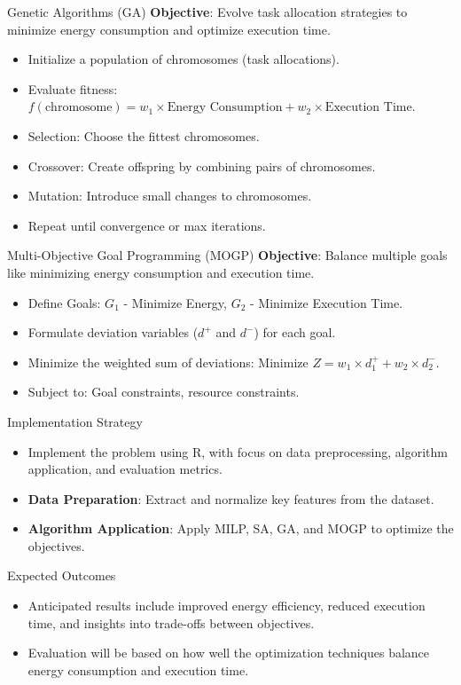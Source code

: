 \documentclass{beamer}
\begin{document}
\begin{frame}{Genetic Algorithms (GA)}
    \textbf{Objective}: Evolve task allocation strategies to minimize energy consumption and optimize execution time.
    \begin{itemize}
        \item Initialize a population of chromosomes (task allocations).
        \item Evaluate fitness: \(f(\text{chromosome}) = w_1 \times \text{Energy Consumption} + w_2 \times \text{Execution Time}\).
        \item Selection: Choose the fittest chromosomes.
        \item Crossover: Create offspring by combining pairs of chromosomes.
        \item Mutation: Introduce small changes to chromosomes.
        \item Repeat until convergence or max iterations.
    \end{itemize}
\end{frame}

\begin{frame}{Multi-Objective Goal Programming (MOGP)}
    \textbf{Objective}: Balance multiple goals like minimizing energy consumption and execution time.
    \begin{itemize}
        \item Define Goals: \(G_1\) - Minimize Energy, \(G_2\) - Minimize Execution Time.
        \item Formulate deviation variables (\(d^+\) and \(d^-\)) for each goal.
        \item Minimize the weighted sum of deviations: \(\text{Minimize } Z = w_1 \times d_1^+ + w_2 \times d_2^-\).
        \item Subject to: Goal constraints, resource constraints.
    \end{itemize}
\end{frame}

\begin{frame}{Implementation Strategy}
    \begin{itemize}
        \item Implement the problem using R, with focus on data preprocessing, algorithm application, and evaluation metrics.
        \item \textbf{Data Preparation}: Extract and normalize key features from the dataset.
        \item \textbf{Algorithm Application}: Apply MILP, SA, GA, and MOGP to optimize the objectives.
    \end{itemize}
\end{frame}

\begin{frame}{Expected Outcomes}
    \begin{itemize}
        \item Anticipated results include improved energy efficiency, reduced execution time, and insights into trade-offs between objectives.
        \item Evaluation will be based on how well the optimization techniques balance energy consumption and execution time.
    \end{itemize}
\end{frame}
\end{document}

